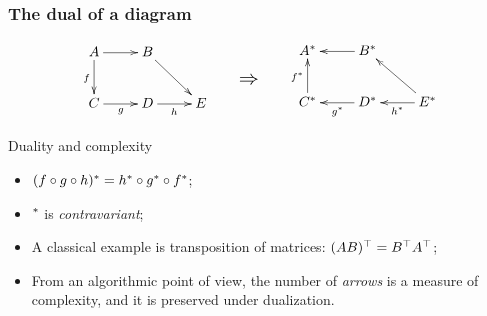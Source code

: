 \documentclass[10pt]{beamer}
\begin{document}
\begin{frame}
  \frametitle{The dual of a diagram}
  
  \[\vcenter{\xymatrix{
    A \ar[r]\ar[d]_f & B\ar[dr] \\
    C \ar[r]_g & D\ar[r]_h & E
  }}
  \qquad
  \text{\Large$\Rightarrow$}
  \qquad
  \vcenter{\xymatrix{
    \dual{A} \ar@{<-}[r]\ar@{<-}[d]_{\dual{f}} & \dual{B}\ar@{<-}[dr] \\
    \dual{C} \ar@{<-}[r]_{\dual{g}} & \dual{D}\ar@{<-}[r]_{\dual{h}} & \dual{E}
  }}\]
  
  \begin{block}{Duality and complexity}
    \begin{itemize}
    \item $(f\circ g\circ h)^\ast = h^\ast\circ g^\ast\circ f^\ast$;
    \item $^\ast$ is \emph{contravariant};
    \item A classical example is transposition of matrices: $(AB)^\top=B^\top A^\top$;
    \item From an algorithmic point of view, the \alert{number of
        \emph{arrows}} is a measure of complexity, and it is
      \alert{preserved} under dualization.
    \end{itemize}
  \end{block}
\end{frame}

\end{document}
